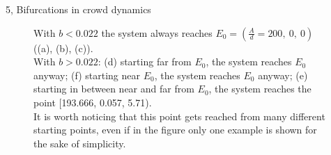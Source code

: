 \documentclass[10pt,a4paper]{article}
\begin{document}
\begin{task}{5, Bifurcations in crowd dynamics}
\begin{figure}[H]
    \hfill
    \caption{With $b < 0.022$ the system always reaches $E_0=(\frac{A}{d}=200,\ 0,\ 0)$ ((a), (b), (c)).\\
    With $b > 0.022$:
    (d) starting far from $E_0$, the system reaches $E_0$ anyway;
    (f) starting near $E_0$, the system reaches $E_0$ anyway;
    (e) starting in between near and far from $E_0$, the system reaches the point [193.666, 0.057, 5.71).\\
    It is worth noticing that this point gets reached from many different starting points, even if in the figure only one example is shown for the sake of simplicity.}
    \label{fig:task5.6}
\end{figure}
\end{task}

\newpage


\end{document}
